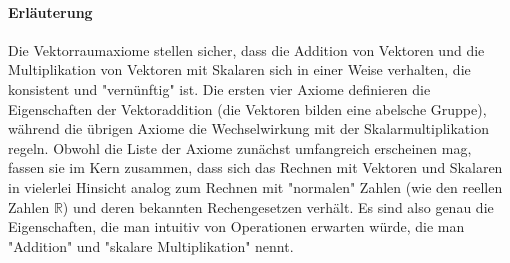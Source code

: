 \paragraph{Erläuterung}
Die Vektorraumaxiome stellen sicher, dass die Addition von Vektoren und die
Multiplikation von Vektoren mit Skalaren sich in einer Weise verhalten, die
konsistent und "vernünftig" ist. Die ersten vier Axiome definieren die
Eigenschaften der Vektoraddition (die Vektoren bilden eine abelsche Gruppe),
während die übrigen Axiome die Wechselwirkung mit der Skalarmultiplikation
regeln. Obwohl die Liste der Axiome zunächst umfangreich erscheinen mag, fassen
sie im Kern zusammen, dass sich das Rechnen mit Vektoren und Skalaren in
vielerlei Hinsicht analog zum Rechnen mit "normalen" Zahlen (wie den reellen
Zahlen $\mathbb{R}$) und deren bekannten Rechengesetzen verhält. Es sind also
genau die Eigenschaften, die man intuitiv von Operationen erwarten würde, die
man "Addition" und "skalare Multiplikation" nennt.
